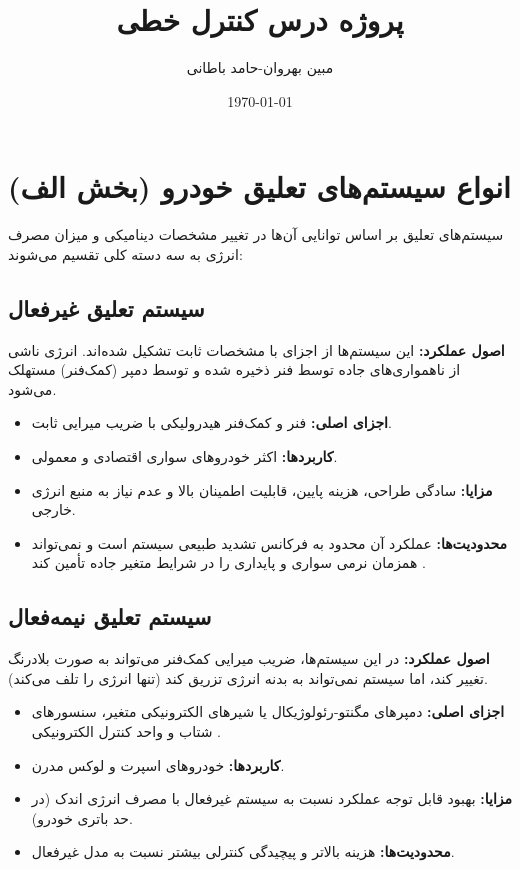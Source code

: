 \documentclass[a4paper]{article}
\title{پروژه درس کنترل خطی\\ \large}
\author{مبین بهروان-حامد باطانی}
\date{\today}
\begin{document}
	
	\maketitle

	\section{انواع سیستم‌های تعلیق خودرو (بخش الف)}
	سیستم‌های تعلیق بر اساس توانایی آن‌ها در تغییر مشخصات دینامیکی و میزان مصرف انرژی به سه دسته کلی تقسیم می‌شوند:
	
	\subsection{سیستم تعلیق غیرفعال }
	\textbf{اصول عملکرد:} این سیستم‌ها از اجزای با مشخصات ثابت تشکیل شده‌اند. انرژی ناشی از ناهمواری‌های جاده توسط فنر ذخیره شده و توسط دمپر (کمک‌فنر) مستهلک می‌شود.
	\begin{itemize}
		\item \textbf{اجزای اصلی:} فنر  و کمک‌فنر هیدرولیکی  با ضریب میرایی ثابت.
		\item \textbf{کاربردها:} اکثر خودروهای سواری اقتصادی و معمولی.
		\item \textbf{مزایا:} سادگی طراحی، هزینه پایین، قابلیت اطمینان بالا و عدم نیاز به منبع انرژی خارجی.
		\item \textbf{محدودیت‌ها:} عملکرد آن محدود به فرکانس تشدید طبیعی سیستم است و نمی‌تواند همزمان نرمی سواری و پایداری را در شرایط متغیر جاده تأمین کند .
	\end{itemize}
	
	\subsection{سیستم تعلیق نیمه‌فعال }
	\textbf{اصول عملکرد:} در این سیستم‌ها، ضریب میرایی کمک‌فنر می‌تواند به صورت بلادرنگ تغییر کند، اما سیستم نمی‌تواند به بدنه انرژی تزریق کند (تنها انرژی را تلف می‌کند).
	\begin{itemize}
		\item \textbf{اجزای اصلی:} دمپرهای مگنتو-رئولوژیکال  یا شیرهای الکترونیکی متغیر، سنسورهای شتاب و واحد کنترل الکترونیکی .
		\item \textbf{کاربردها:} خودروهای اسپرت و لوکس مدرن.
		\item \textbf{مزایا:} بهبود قابل توجه عملکرد نسبت به سیستم غیرفعال با مصرف انرژی اندک (در حد باتری خودرو).
		\item \textbf{محدودیت‌ها:} هزینه بالاتر و پیچیدگی کنترلی بیشتر نسبت به مدل غیرفعال.
	\end{itemize}
	
\end{document}
